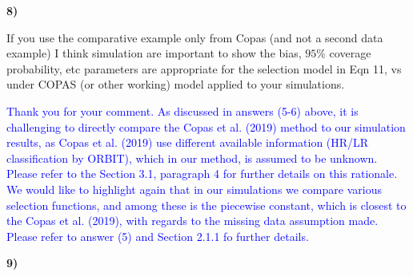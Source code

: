 \documentclass{article}
\begin{document}
\bigskip

\textbf{8)}

\bigskip

If you use the comparative example only from Copas (and not a second data example) I think simulation are important to show the bias, $95\%$ coverage probability, etc parameters are appropriate for the selection model in Eqn 11, vs under COPAS (or other working) model applied to your simulations. 

\bigskip


\textcolor{blue}{Thank you for your comment. As discussed in answers (5-6) above, it is challenging to directly compare the Copas et al. (2019) method to our simulation results, as Copas et al. (2019) use different available information (HR/LR classification by ORBIT), which in our method, is assumed to be unknown. Please refer to the Section 3.1, paragraph 4 for further details on this rationale. We would like to highlight again that in our simulations we compare various selection functions, and among these is the piecewise constant, which is closest to the Copas et al. (2019), with regards to the missing data assumption made. Please refer to answer (5) and Section 2.1.1 fo further details.}


\bigskip

\textbf{9)}
\end{document}
